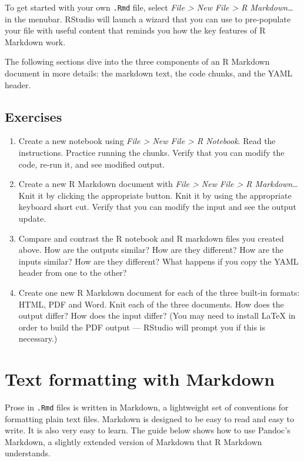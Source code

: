 \documentclass[]{book}
\begin{document}
To get started with your own \texttt{.Rmd} file, select \emph{File
\textgreater{} New File \textgreater{} R Markdown\ldots{}} in the
menubar. RStudio will launch a wizard that you can use to pre-populate
your file with useful content that reminds you how the key features of R
Markdown work.

The following sections dive into the three components of an R Markdown
document in more details: the markdown text, the code chunks, and the
YAML header.

\subsection{Exercises}\label{exercises-68}

\begin{enumerate}
\def\labelenumi{\arabic{enumi}.}
\item
  Create a new notebook using \emph{File \textgreater{} New File
  \textgreater{} R Notebook}. Read the instructions. Practice running
  the chunks. Verify that you can modify the code, re-run it, and see
  modified output.
\item
  Create a new R Markdown document with \emph{File \textgreater{} New
  File \textgreater{} R Markdown\ldots{}} Knit it by clicking the
  appropriate button. Knit it by using the appropriate keyboard short
  cut. Verify that you can modify the input and see the output update.
\item
  Compare and contrast the R notebook and R markdown files you created
  above. How are the outputs similar? How are they different? How are
  the inputs similar? How are they different? What happens if you copy
  the YAML header from one to the other?
\item
  Create one new R Markdown document for each of the three built-in
  formats: HTML, PDF and Word. Knit each of the three documents. How
  does the output differ? How does the input differ? (You may need to
  install LaTeX in order to build the PDF output --- RStudio will prompt
  you if this is necessary.)
\end{enumerate}

\section{Text formatting with
Markdown}\label{text-formatting-with-markdown}

Prose in \texttt{.Rmd} files is written in Markdown, a lightweight set
of conventions for formatting plain text files. Markdown is designed to
be easy to read and easy to write. It is also very easy to learn. The
guide below shows how to use Pandoc's Markdown, a slightly extended
version of Markdown that R Markdown understands.
\end{document}
